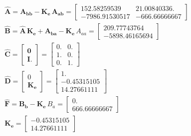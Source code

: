 \documentclass[
	12pt,				%
	article,			%
	openright,			%
	oneside,
	a4paper,			%
	chapter=TITLE,		%
	section=TITLE,		%
	english,			%
	french,				%
	spanish,			%
	brazil,				%
]{abntex2}
\begin{document}
                \begin{eqnarray}
                    \nonumber
                    \boldsymbol{\hat{A}} = \boldsymbol{A_{bb}} - \boldsymbol{K_e}\,\boldsymbol{A_{ab}} =
                    \begin{bmatrix}
                        152.58259539   &   21.00840336.  \\
                        -7986.91530517 & -666.66666667
                    \end{bmatrix} \\
                    \nonumber
                    \boldsymbol{\hat{B}} = \boldsymbol{\hat{A}}\,\boldsymbol{K_e} + \boldsymbol{A_{ba}} - \boldsymbol{K_e}\,A_{aa} =
                    \begin{bmatrix}
                        209.77743764    \\
                        -5898.46165694
                    \end{bmatrix} \\
                    \nonumber
                    \boldsymbol{\hat{C}} = 
                    \begin{bmatrix}
                        \boldsymbol{0} \\
                        \boldsymbol{I}.
                    \end{bmatrix} = 
                    \begin{bmatrix}
                        0. & 0.     \\
                        1. & 0.     \\
                        0. & 1.
                    \end{bmatrix} \\
                    \nonumber
                    \boldsymbol{\hat{D}} =
                    \begin{bmatrix}
                        0 \\
                        \boldsymbol{K_e}
                    \end{bmatrix} = 
                    \begin{bmatrix}
                        1. \\
                        -0.45315105 \\
                        14.27661111
                    \end{bmatrix} \\
                    \nonumber
                    \boldsymbol{\hat{F}} = \boldsymbol{B_b} - \boldsymbol{K_e}\,B_a = 
                    \begin{bmatrix}
                        0. \\
                        666.66666667
                    \end{bmatrix} \\
                    \label{eq-Ke}
                    \boldsymbol{K_e} = \begin{bmatrix}
                        -0.45315105 \\
                        14.27661111
                    \end{bmatrix}
                \end{eqnarray}
            
\end{document}
